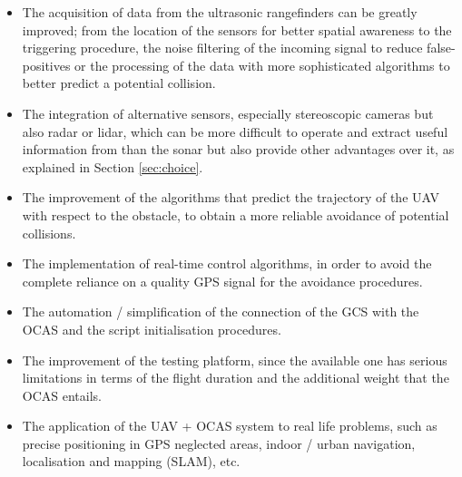 \begin{itemize}

	\item The acquisition of data from the ultrasonic rangefinders can be greatly improved; from the location of the sensors for better spatial awareness to the triggering procedure, the noise filtering of the incoming signal to reduce false-positives or the processing of the data with more sophisticated algorithms to better predict a potential collision.

	\item The integration of alternative sensors, especially stereoscopic cameras but also radar or lidar, which can be more difficult to operate and extract useful information from than the sonar but also provide other advantages over it, as explained in Section \ref{sec:choice}.

	\item The improvement of the algorithms that predict the trajectory of the UAV with respect to the obstacle, to obtain a more reliable avoidance of potential collisions.

	\item The implementation of real-time control algorithms, in order to avoid the complete reliance on a quality GPS signal for the avoidance procedures.

	\item The automation / simplification of the connection of the GCS with the OCAS and the script initialisation procedures.

	\item The improvement of the testing platform, since the available one has serious limitations in terms of the flight duration and the additional weight that the OCAS entails.

	\item The application of the UAV + OCAS system to real life problems, such as precise positioning in GPS neglected areas, indoor / urban navigation, localisation and mapping (SLAM), etc.

\end{itemize}
